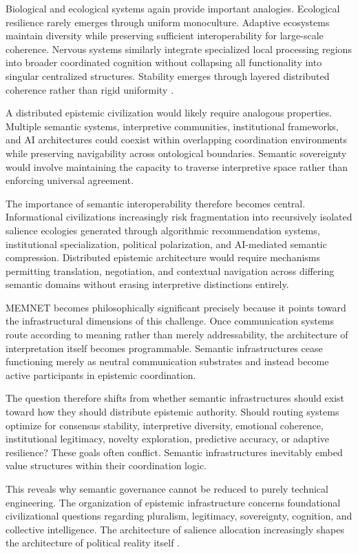 \documentclass[11pt,a4paper]{article}
\begin{document}
Biological and ecological systems again provide important analogies. Ecological resilience rarely emerges through uniform monoculture. Adaptive ecosystems maintain diversity while preserving sufficient interoperability for large-scale coherence. Nervous systems similarly integrate specialized local processing regions into broader coordinated cognition without collapsing all functionality into singular centralized structures. Stability emerges through layered distributed coherence rather than rigid uniformity \cite{friston2010}.

A distributed epistemic civilization would likely require analogous properties. Multiple semantic systems, interpretive communities, institutional frameworks, and AI architectures could coexist within overlapping coordination environments while preserving navigability across ontological boundaries. Semantic sovereignty would involve maintaining the capacity to traverse interpretive space rather than enforcing universal agreement.

The importance of semantic interoperability therefore becomes central. Informational civilizations increasingly risk fragmentation into recursively isolated salience ecologies generated through algorithmic recommendation systems, institutional specialization, political polarization, and AI-mediated semantic compression. Distributed epistemic architecture would require mechanisms permitting translation, negotiation, and contextual navigation across differing semantic domains without erasing interpretive distinctions entirely.

MEMNET becomes philosophically significant precisely because it points toward the infrastructural dimensions of this challenge. Once communication systems route according to meaning rather than merely addressability, the architecture of interpretation itself becomes programmable. Semantic infrastructures cease functioning merely as neutral communication substrates and instead become active participants in epistemic coordination.

The question therefore shifts from whether semantic infrastructures should exist toward how they should distribute epistemic authority. Should routing systems optimize for consensus stability, interpretive diversity, emotional coherence, institutional legitimacy, novelty exploration, predictive accuracy, or adaptive resilience? These goals often conflict. Semantic infrastructures inevitably embed value structures within their coordination logic.

This reveals why semantic governance cannot be reduced to purely technical engineering. The organization of epistemic infrastructure concerns foundational civilizational questions regarding pluralism, legitimacy, sovereignty, cognition, and collective intelligence. The architecture of salience allocation increasingly shapes the architecture of political reality itself \cite{latour2005}.
\end{document}

